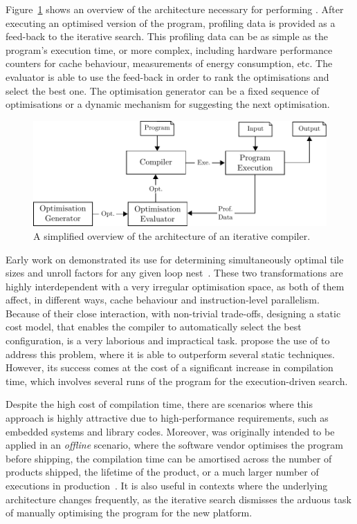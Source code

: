 Figure~\ref{fig:itercomp-diagram} shows an overview of the architecture necessary for performing {\itercomp}.
After executing an optimised version of the program, profiling data is provided as a feed-back to the iterative search.
This profiling data can be as simple as the program's execution time, or more complex, including hardware performance counters for cache behaviour, measurements of energy consumption, etc.
The evaluator is able to use the feed-back in order to rank the optimisations and select the best one.
The optimisation generator can be a fixed sequence of optimisations or a dynamic mechanism for suggesting the next optimisation.

\begin{figure}[htb]
    \centering
    \includegraphics[width=\linewidth]{figs/itercomp-diagram}
    \caption{A simplified overview of the architecture of an iterative compiler.}
    \label{fig:itercomp-diagram}
\end{figure}

Early work on {\itercomp} demonstrated its use for determining simultaneously optimal tile sizes and unroll factors for any given loop nest~\cite{kisuki00,knijnenburg04}.
These two transformations are highly interdependent with a very irregular optimisation space, as both of them affect, in different ways, cache behaviour and instruction-level parallelism.
Because of their close interaction, with non-trivial trade-offs, designing a static cost model, that enables the compiler to automatically select the best configuration, is a very laborious and impractical task.
\cite{kisuki00} propose the use of {\itercomp} to address this problem, where it is able to outperform several static techniques.
However, its success comes at the cost of a significant increase in compilation time, which involves several runs of the program for the execution-driven search.

Despite the high cost of compilation time, there are scenarios where this approach is highly attractive due to high-performance requirements, such as embedded systems and library codes.
Moreover, {\itercomp} was originally intended to be applied in an \textit{offline} scenario, where the software vendor optimises the program before shipping, the compilation time can be amortised across the number of products shipped, the lifetime of the product, or a much larger number of executions in production~\cite{kisuki99,kisuki00,chen10}.
It is also useful in contexts where the underlying architecture changes frequently, as the iterative search dismisses the arduous task of manually optimising the program for the new platform.

